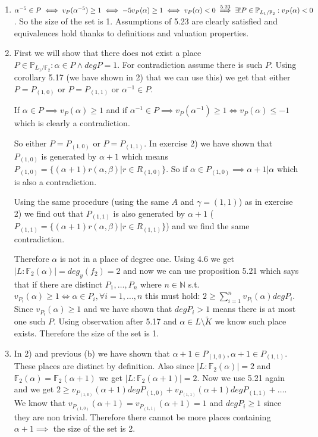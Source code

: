 \documentclass[12pt, a4paper]{article}
\begin{document}
\section{}
\begin{enumerate}[label=(\alph*)]
\item $\alpha^{-5} \in P \iff v_P(\alpha^{-5})\geq 1 \iff -5v_P(\alpha)\geq 1 \iff v_P(\alpha) < 0 \stackrel{\text{5.23}}{\implies} \\\exists! P \in \mathbb{P}_{L_1/\mathbb{F}_2} : v_P(\alpha)<0$. So the size of the set is 1. Assumptions of 5.23 are clearly satisfied and equivalences hold thanks to definitions and valuation properties.

\item First we will show that there does not exist a place $P \in \mathbb{P}_{L_1/\mathbb{F}_2}: \alpha \in P \land deg P = 1$. For contradiction assume there is such $P$. Using corollary 5.17 (we have shown in 2) that we can use this) we get that either $P = P_{(1,0)}$ or $P = P_{(1,1)}$ or $\alpha^{-1} \in P$. 

If $\alpha \in P \implies v_P(\alpha)\geq 1$ and if $\alpha^{-1} \in P \implies v_P(\alpha^{-1}) \geq 1 \iff v_P(\alpha) \leq -1$ which is clearly a contradiction. 

So either $P = P_{(1,0)}$ or $P = P_{(1,1)}$. In exercise 2) we have shown that $P_{(1,0)}$ is generated by $\alpha+1$ which means $P_{(1,0)}=\{(\alpha+1)r(\alpha,\beta)|r\in R_{(1,0)}\}$. So if $\alpha \in P_{(1,0)} \implies \alpha + 1 | \alpha$ which is also a contradiction. 

Using the same procedure (using the same $A$ and $\gamma =(1,1)$) as in exercise 2) we find out that $P_{(1,1)}$ is also generated by $\alpha+1$ ($P_{(1,1)}=\{(\alpha+1)r(\alpha,\beta)|r\in R_{(1,1)}\}$) and we find the same contradiction.

Therefore $\alpha$ is not in a place of degree one. Using 4.6 we get $|L:\mathbb{F}_2(\alpha)|=deg_y(f_2)=2$ and now we can use proposition 5.21 which says that if there are distinct $P_1,\dots,P_n$ where $n\in \mathbb{N}$ s.t. $v_{P_i}(\alpha)\geq 1 \iff \alpha \in P_i, \forall i=1,\dots,n$ this must hold: $2\geq \sum_{i=1}^n v_{P_i}(\alpha) deg P_i$. Since $v_{P_i}(\alpha)\geq 1$ and we have shown that $degP_i > 1$ means there is at most one such $P$. Using observation after 5.17 and $\alpha \in L \setminus \tilde{K}$ we know such place exists. Therefore the size of the set is 1.

\item In 2) and previous (b) we have shown that $\alpha+1 \in P_{(1,0)}, \alpha+1 \in P_{(1,1)}$. These places are distinct by definition. Also since $|L:\mathbb{F}_2(\alpha)| = 2$ and $\mathbb{F}_2(\alpha) = \mathbb{F}_2(\alpha+1)$ we get $|L:\mathbb{F}_2(\alpha+1)| = 2$. Now we use 5.21 again and we get $2\geq v_{P_{(1,0)}}(\alpha+1)degP_{(1,0)} + v_{P_{(1,1)}}(\alpha+1)degP_{(1,1)} + \dots$. We know that $v_{P_{(1,0)}}(\alpha+1) = v_{P_{(1,1)}}(\alpha+1) = 1$ and $deg P_i \geq 1$ since they are non trivial. Therefore there cannot be more places containing $\alpha+1 \implies$ the size of the set is 2.


\end{enumerate}
\end{document}
